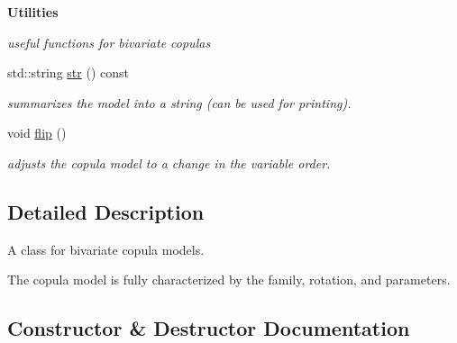 \begin{Indent}{\bf Utilities}\par
{\em useful functions for bivariate copulas }\begin{DoxyCompactItemize}
\item 
std\+::string \hyperlink{classvinecopulib_1_1_bicop_abe2b1406729a15c22e9588b0c38c4047}{str} () const \hypertarget{classvinecopulib_1_1_bicop_abe2b1406729a15c22e9588b0c38c4047}{}\label{classvinecopulib_1_1_bicop_abe2b1406729a15c22e9588b0c38c4047}

\begin{DoxyCompactList}\small\item\em summarizes the model into a string (can be used for printing). \end{DoxyCompactList}\item 
void \hyperlink{classvinecopulib_1_1_bicop_a59b7087b3857350df25ff684ab96f377}{flip} ()\hypertarget{classvinecopulib_1_1_bicop_a59b7087b3857350df25ff684ab96f377}{}\label{classvinecopulib_1_1_bicop_a59b7087b3857350df25ff684ab96f377}

\begin{DoxyCompactList}\small\item\em adjust\textquotesingle{}s the copula model to a change in the variable order. \end{DoxyCompactList}\end{DoxyCompactItemize}
\end{Indent}


\subsection{Detailed Description}
A class for bivariate copula models. 

The copula model is fully characterized by the family, rotation, and parameters. 

\subsection{Constructor \& Destructor Documentation}

